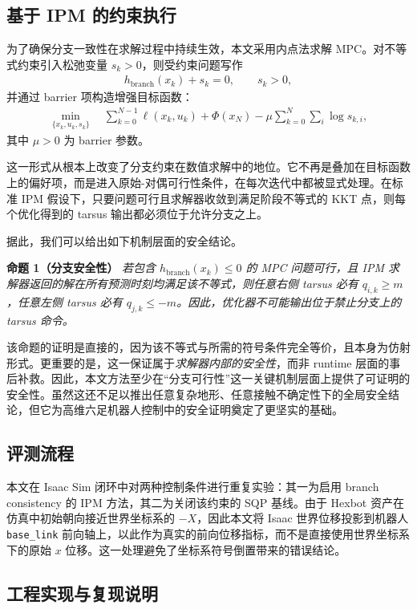 \subsection{基于 IPM 的约束执行}

为了确保分支一致性在求解过程中持续生效，本文采用内点法求解 MPC。对不等式约束引入松弛变量 $s_k > 0$，则受约束问题写作
\begin{align}
h_{\mathrm{branch}}(x_k) + s_k = 0, \qquad s_k > 0,
\end{align}
并通过 barrier 项构造增强目标函数：
\begin{align}
\min_{\{x_k,u_k,s_k\}} \quad
\sum_{k=0}^{N-1} \ell(x_k,u_k) + \Phi(x_N)
- \mu \sum_{k=0}^{N} \sum_i \log s_{k,i},
\end{align}
其中 $\mu > 0$ 为 barrier 参数。

这一形式从根本上改变了分支约束在数值求解中的地位。它不再是叠加在目标函数上的偏好项，而是进入原始-对偶可行性条件，在每次迭代中都被显式处理。在标准 IPM 假设下，只要问题可行且求解器收敛到满足阶段不等式的 KKT 点，则每个优化得到的 tarsus 输出都必须位于允许分支之上。

据此，我们可以给出如下机制层面的安全结论。

\textbf{命题 1（分支安全性）}
\emph{若包含 $h_{\mathrm{branch}}(x_k)\le 0$ 的 MPC 问题可行，且 IPM 求解器返回的解在所有预测时刻均满足该不等式，则任意右侧 tarsus 必有 $q_{i,k}\ge m$，任意左侧 tarsus 必有 $q_{j,k}\le -m$。因此，优化器不可能输出位于禁止分支上的 tarsus 命令。}

该命题的证明是直接的，因为该不等式与所需的符号条件完全等价，且本身为仿射形式。更重要的是，这一保证属于\emph{求解器内部的安全性}，而非 runtime 层面的事后补救。因此，本文方法至少在“分支可行性”这一关键机制层面上提供了可证明的安全性。虽然这还不足以推出任意复杂地形、任意接触不确定性下的全局安全结论，但它为高维六足机器人控制中的安全证明奠定了更坚实的基础。

\subsection{评测流程}

本文在 Isaac Sim 闭环中对两种控制条件进行重复实验：其一为启用 branch consistency 的 IPM 方法，其二为关闭该约束的 SQP 基线。由于 Hexbot 资产在仿真中初始朝向接近世界坐标系的 $-X$，因此本文将 Isaac 世界位移投影到机器人 \texttt{base\_link} 前向轴上，以此作为真实的前向位移指标，而不是直接使用世界坐标系下的原始 $x$ 位移。这一处理避免了坐标系符号倒置带来的错误结论。

\subsection{工程实现与复现说明}

